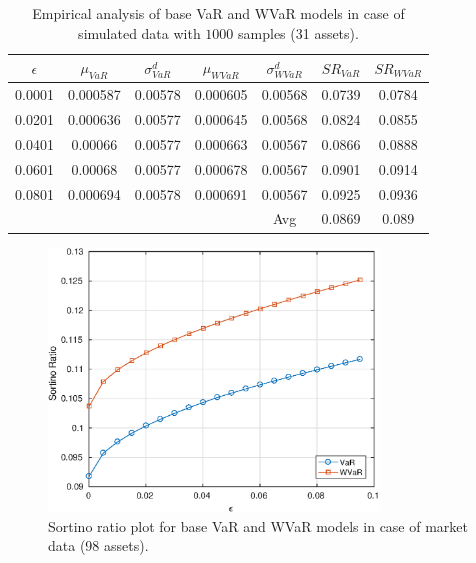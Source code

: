 \documentclass[12pt]{article}
\numberwithin{equation}{section}
\begin{document}
\begin{table}[!h]
\centering
\captionsetup{justification=centering}
\begin{tabular}{||c|c|c|c|c|c|c||}
\hline
$\epsilon$ & $\mu_{VaR}$ & $\sigma_{VaR}^{d}$ & $\mu_{WVaR}$ & $\sigma_{WVaR}^{d}$ & $SR_{VaR}$ & $SR_{WVaR}$\\
\hline
0.0001 & 0.000587 & 0.00578 & 0.000605 & 0.00568 & 0.0739 & 0.0784 \\
0.0201 & 0.000636 & 0.00577 & 0.000645 & 0.00568 & 0.0824 & 0.0855 \\
0.0401 & 0.00066 & 0.00577 & 0.000663 & 0.00567 & 0.0866 & 0.0888 \\
0.0601 & 0.00068 & 0.00577 & 0.000678 & 0.00567 & 0.0901 & 0.0914 \\
0.0801 & 0.000694 & 0.00578 & 0.000691 & 0.00567 & 0.0925 & 0.0936 \\
\hline
& & & & Avg & 0.0869 & 0.089 \\
\hline
\end{tabular}
\caption{Empirical analysis of base VaR and WVaR models in case of simulated data with $1000$ samples (31 assets).}
\label{tab:5.3}
\end{table}

\begin{figure}[!h]
\centering
\includegraphics[height=7.0cm]{var_100m.eps}
\caption{Sortino ratio plot for base VaR and WVaR models in case of market data (98 assets).}
\label{fig:5.4}
\end{figure}
\end{document}
